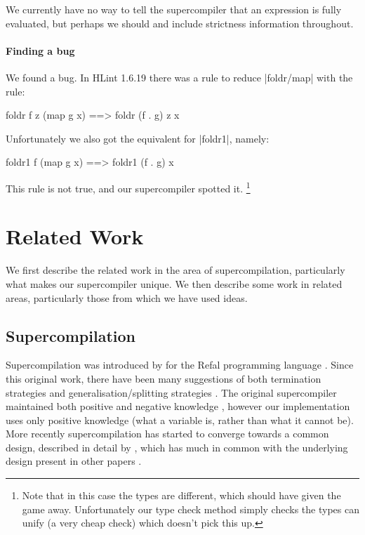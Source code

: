 \documentclass[draft]{sigplanconf}
\begin{document}
We currently have no way to tell the supercompiler that an expression is fully evaluated, but perhaps we should and include strictness information throughout.

\paragraph{Finding a bug}

We found a bug. In HLint 1.6.19 there was a rule to reduce |foldr/map| with the rule:

\begin{code}
foldr f z (map g x) ==> foldr (f . g) z x
\end{code}

Unfortunately we also got the equivalent for |foldr1|, namely:

\begin{code}
foldr1 f (map g x) ==> foldr1 (f . g) x
\end{code}

This rule is not true, and our supercompiler spotted it. \footnote{Note that in this case the types are different, which should have given the game away. Unfortunately our type check method simply checks the types can unify (a very cheap check) which doesn't pick this up.}


\section{Related Work}

We first describe the related work in the area of supercompilation, particularly what makes our supercompiler unique. We then describe some work in related areas, particularly those from which we have used ideas.

\subsection{Supercompilation}
\label{sec:comparison}

Supercompilation was introduced by \citet{supercompilation} for the Refal programming language \cite{refal}. Since this original work, there have been many suggestions of both termination strategies and generalisation/splitting strategies \cite{turchin:generalisation,sorensen:supercompilation,leuschel:homeomorphic}. The original supercompiler maintained both positive and negative knowledge \cite{secher:perfect_supercompilation}, however our implementation uses only positive knowledge (what a variable is, rather than what it cannot be). More recently supercompilation has started to converge towards a common design, described in detail by \citet{klyuchnikov:hosc}, which has much in common with the underlying design present in other papers \cite{me:supero,jonsson:supercompilation}.
\end{document}
